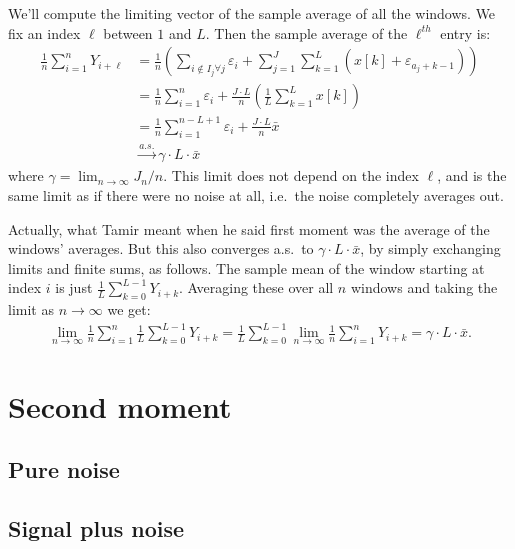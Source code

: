 \documentclass{article}
\theoremstyle{thm}
\theoremstyle{definition}
\newcommand{\ep}{\varepsilon}
\begin{document}
We'll compute the limiting vector of the sample average of all the windows. We fix an index $\ell$ between $1$ and $L$. Then the sample average of the $\ell^{th}$ entry is:
%
\begin{align}
%
    \frac{1}{n} \sum_{i=1}^n Y_{i+\ell} &=
    \frac{1}{n}  \left( \sum_{i \notin I_j \forall j} \ep_i 
                  + \sum_{j=1}^J \sum_{k=1}^L (x[k] + \ep_{a_j + k-1} ) \right) 
    \nonumber \\
%
                &= \frac{1}{n}\sum_{i=1}^{n} \ep_i 
                  + \frac{J \cdot L}{n} \left(\frac{1}{L} \sum_{k=1}^L x[k]\right) 
    \nonumber \\
                &= \frac{1}{n}\sum_{i=1}^{n-L+1} \ep_i 
                  + \frac{J \cdot L}{n} \bar{x}       \nonumber \\
%
                &\operatorname*{\longrightarrow}^{a.s.}  \gamma  \cdot L \cdot \bar{x}
%
\end{align}
%
where $\gamma = \lim_{n\to\infty} J_n / n$. This limit does not depend on the index $\ell$, and is the same limit as if there were no noise at all, i.e.\ the noise completely averages out.

Actually, what Tamir meant when he said first moment was the average of the windows' averages. But this also converges a.s.\ to $\gamma \cdot L \cdot \bar{x}$, by simply exchanging limits and finite sums, as follows. The sample mean of the window starting at index $i$ is just $\frac{1}{L} \sum_{k=0}^{L-1} Y_{i+k}$. Averaging these over all $n$ windows and taking the limit as $n \to \infty$ we get:
%
\begin{align}
%
    \lim_{n\to\infty} \frac{1}{n} \sum_{i=1}^n \frac{1}{L} \sum_{k=0}^{L-1} Y_{i+k}
    =  \frac{1}{L} \sum_{k=0}^{L-1} \lim_{n\to\infty} \frac{1}{n} \sum_{i=1}^n Y_{i+k}
    = \gamma \cdot L \cdot \bar{x}.
%
\end{align}







\section{Second moment}

\subsection{Pure noise}



\subsection{Signal plus noise}
\end{document}
